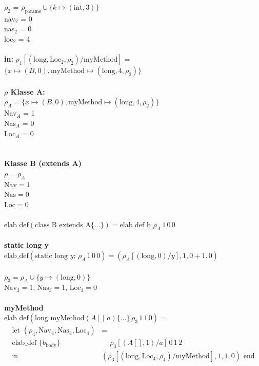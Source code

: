 \documentclass[11pt,a4paper]{article}
\begin{document}
%
$\rho_2$ = $\rho_\text{params} \cup \{k \mapsto (\text{int}, 3)\}$\\
nav$_2$ = 0\\
nas$_2$ = 0\\
loc$_2$ = 4\\
%
\\\textbf{in:}
$\rho_1[(\text{long}, \text{Loc}_2, \rho_2)/\text{myMethod}] =$
$\{x \mapsto (B, 0), \text{myMethod} \mapsto (\text{long}, 4, \rho_2)\}$\\\\
%
%
\textbf{$\rho$ Klasse A:}\\
$\rho_A = \{x \mapsto (B, 0), \text{myMethod} \mapsto (\text{long}, 4, \rho_2)\}$\\
Nav$_A$ = 1\\
Nas$_A$ = 0\\
Loc$_A$ = 0\\
%
\\\\
%
\textbf{Klasse B (extends A)}\\
$\rho = \rho_A$\\ $\text{Nav} = 1$\\ $\text{Nas} = 0$\\ $\text{Loc} = 0$\\\\
%
$\text{elab\_def}(\text{class B extends A} \{...\}) = \text{elab\_def b }\rho_A \,1 \,0 \,0$\\\\
%
\textbf{static long y}\\
$\text{elab\_def}(\text{static long } y; \, \rho_A \, 1 \, 0 \, 0) = (\rho_A[(\text{long}, 0)/y], 1, 0 + 1, 0)$\\\\
%
$\rho_3 = \rho_A \cup \{y \mapsto (\text{long}, 0)\}$\\
$\text{Nav}_3 = 1$, $\text{Nas}_3 = 1$, $\text{Loc}_3 = 0$\\\\
%
\textbf{myMethod}\\
$\text{elab\_def}(\text{long myMethod}(A[] \, a) \{...\} \, \rho_3 \, 1 \, 1 \, 0) =$
\begin{align*}
\text{let } (\rho_4, \text{Nav}_4, \text{Nas}_4, \text{Loc}_4) &= \\
\text{elab\_def } \{b_{\text{body}}\} &\quad\, \rho_3[(A[], 1)/a] \, 0 \, 1 \, 2 \\
\text{in } &(\rho_3[(\text{long}, \text{Loc}_4, \rho_4)/\text{myMethod}], 1, 1, 0) \text{ end}
\end{align*}
\end{document}
